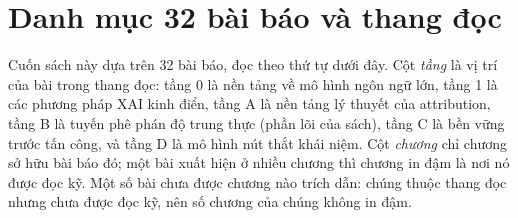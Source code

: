 \chapter{Danh mục 32 bài báo và thang đọc}
\label{app:danh-muc}

Cuốn sách này dựa trên 32 bài báo, đọc theo thứ tự dưới đây. Cột
\emph{tầng} là vị trí của bài trong thang đọc: tầng 0 là nền tảng về mô
hình ngôn ngữ lớn, tầng 1 là các phương pháp XAI kinh điển, tầng A là nền
tảng lý thuyết của attribution, tầng B là tuyến phê phán độ trung thực
(phần lõi của sách), tầng C là bền vững trước tấn công, và tầng D là mô
hình nút thắt khái niệm. Cột \emph{chương} chỉ chương sở hữu bài báo đó;
một bài xuất hiện ở nhiều chương thì chương in đậm là nơi nó được đọc kỹ.
Một số bài chưa được chương nào trích dẫn: chúng thuộc thang đọc nhưng chưa
được đọc kỹ, nên số chương của chúng không in đậm.

